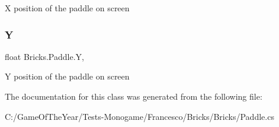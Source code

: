 X position of the paddle on screen 

\mbox{\label{class_bricks_1_1_paddle_a6dd6d381807daabe3c82e1f87ecb01bd}} 
\subsubsection{\texorpdfstring{Y}{Y}}
{\footnotesize\ttfamily float Bricks.\+Paddle.\+Y\hspace{0.3cm}{\ttfamily [get]}, {\ttfamily [set]}}



Y position of the paddle on screen 



The documentation for this class was generated from the following file\+:\begin{DoxyCompactItemize}
\item 
C\+:/\+Game\+Of\+The\+Year/\+Tests-\/\+Monogame/\+Francesco/\+Bricks/\+Bricks/Paddle.\+cs\end{DoxyCompactItemize}
